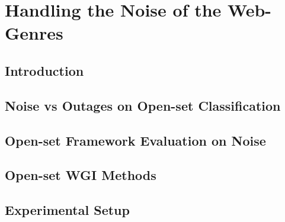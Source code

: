 
\chapter{Handling the Noise of the Web-Genres}

\label{chap:noise}


\newcommand{\keyword}[1]{\textbf{#1}}
\newcommand{\tabhead}[1]{\textbf{#1}}
\newcommand{\code}[1]{\texttt{#1}}
\newcommand{\file}[1]{\texttt{\bfseries#1}}
\newcommand{\option}[1]{\texttt{\itshape#1}}


\section{Introduction}\label{chap:noise:sec:intro}

\section{Noise vs Outages on Open-set Classification}\label{chap:noise:sec:noise_vs_outages}

\section{Open-set Framework Evaluation on Noise}\label{chap:noise:sec:openset_evaluation}


\section{Open-set WGI Methods}\label{sec:Ensembles_Description}



\section{Experimental Setup}\label{sec:experimental_setup}
